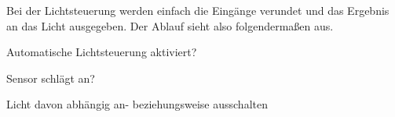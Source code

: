 Bei der Lichtsteuerung werden einfach die Eingänge verundet und das Ergebnis an das Licht ausgegeben. Der Ablauf sieht also folgendermaßen aus.
\item{Automatische Lichtsteuerung aktiviert?}
\item{Sensor schlägt an?}
\item{Licht davon abhängig an- beziehungsweise ausschalten}

